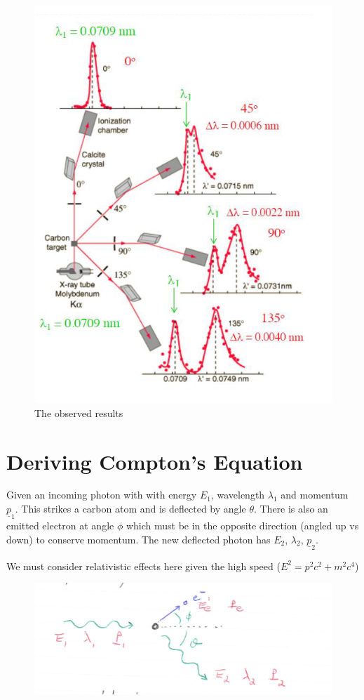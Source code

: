 \begin{figure}[H]
    \centering
    \includegraphics{figures/lec03-07.png}
     \caption{The observed results}
\end{figure}

\section*{Deriving Compton's Equation}
Given an incoming photon with with energy $E_1$, wavelength $\lambda_1$ and momentum $\underline{p}_1$. This strikes a carbon atom and is deflected by angle $\theta$. There is also an emitted electron at angle $\phi$ which must be in the opposite direction (angled up vs down) to conserve momentum. The new deflected photon has $E_2$, $\lambda_2$, $\underline{p}_2$.

We must consider relativistic effects here given the high speed ($E^2 = p^2c^2 + m^2c^4$)

\begin{figure}[H]
    \centering
    \includegraphics{figures/lec03-08.png}
     \caption{}
\end{figure}

